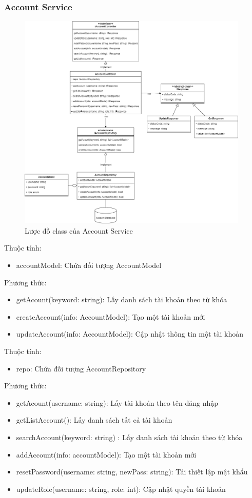 \subsubsection{Account Service}
\begin{figure}[!htp]
	\centering
	\includegraphics[width=11cm]{img/Architecture/service/AccountService.png}
	\newline
	\caption{Lược đồ class của Account Service}
\end{figure}

Thuộc tính:
\begin{itemize}
	\item accountModel: Chứa đối tượng AccountModel
\end{itemize}
Phương thức:
\begin{itemize}
	\item getAcount(keyword: string): Lấy danh sách tài khoản theo từ khóa
	\item createAccount(info: AccountModel): Tạo một tài khoản mới
	\item updateAccount(info: AccountModel): Cập nhật thông tin một tài khoản
\end{itemize}

Thuộc tính:
\begin{itemize}
	\item repo: Chứa đối tượng AccountRepository
\end{itemize}
Phương thức:
\begin{itemize}
	\item getAcount(username: string): Lấy tài khoản theo tên đăng nhập
	\item getListAccount(): Lấy danh sách tất cả tài khoản
	\item searchAccount(keyword: string) : Lấy danh sách tài khoản theo từ khóa
	\item addAccount(info: accountModel): Tạo một tài khoản mới
	\item resetPassword(username: string, newPass: string): Tái thiết lập mật khẩu
	\item updateRole(username: string, role: int): Cập nhật quyền tài khoản
\end{itemize}


